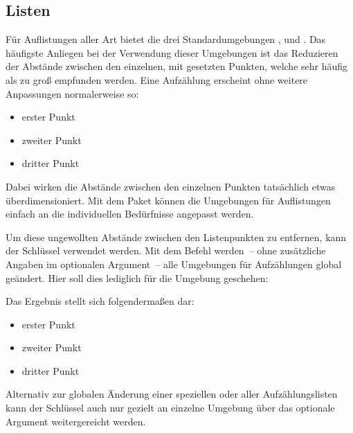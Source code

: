 \documentclass[%
  english,ngerman,%
  geometry=no,DIV=12,automark,%
]{tudscrartcl}
\begin{document}
\subsection{Listen}
\label{sec:lists}
Für Auflistungen aller Art bietet  die drei Standardumgebungen 
,  und . 
Das häufigste Anliegen bei der Verwendung dieser Umgebungen ist das Reduzieren 
der Abstände zwischen den einzelnen, mit  gesetzten Punkten, welche 
sehr häufig als zu groß empfunden werden. Eine Aufzählung erscheint ohne 
weitere Anpassungen normalerweise so:
%
\begin{Hint*}
\begin{itemize}
\item erster Punkt
\item zweiter Punkt
\item dritter Punkt
\end{itemize}
\end{Hint*}
%
Dabei wirken die Abstände zwischen den einzelnen Punkten tatsächlich etwas 
überdimensioniert. Mit dem Paket  können die Umgebungen für 
Auflistungen einfach an die individuellen Bedürfnisse angepasst werden. 
%
\begin{Preamble}
\usepackage{enumitem}
\end{Preamble}
Um diese ungewollten Abstände zwischen den Listenpunkten zu entfernen, kann der 
Schlüssel  verwendet werden. Mit dem Befehl  
werden~-- ohne zusätzliche Angaben im optionalen Argument~-- alle Umgebungen 
für Aufzählungen global geändert. Hier soll dies lediglich für die Umgebung 
 geschehen:
\begin{Preamble*}

\end{Preamble*}
%
Das Ergebnis stellt sich folgendermaßen dar:
%
\begin{Hint*}
\begin{itemize}
\item erster Punkt
\item zweiter Punkt
\item dritter Punkt
\end{itemize}

\end{Hint*}
%
Alternativ zur globalen Änderung einer speziellen oder aller Aufzählungslisten 
kann der Schlüssel  auch nur gezielt an einzelne Umgebung 
über das optionale Argument weitergereicht werden.
\end{document}
